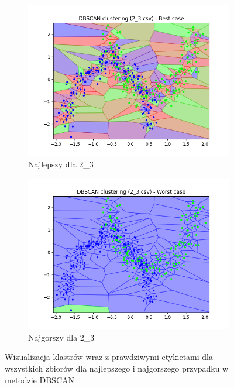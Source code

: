 \documentclass[12pt]{article}
\begin{document}
\begin{figure}[H]
\begin{subfigure}[b]{0.24\textwidth}
        \includegraphics[width=\linewidth]{img/exp_2/dbscan/2_3_best.png}
        \caption{Najlepszy dla 2\_3}
    \end{subfigure}
    \hfill
    \begin{subfigure}[b]{0.24\textwidth}
        \includegraphics[width=\linewidth]{img/exp_2/dbscan/2_3_worst.png}
        \caption{Najgorszy dla 2\_3}
    \end{subfigure}
    \caption{\centering Wizualizacja klastrów wraz z prawdziwymi etykietami dla wszystkich zbiorów dla najlepszego i najgorszego przypadku w metodzie DBSCAN}
\end{figure}

\newpage
\end{document}
